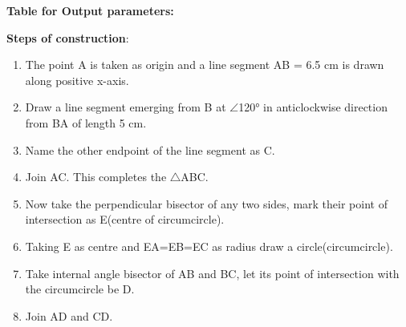 \documentclass[journal,12pt,twocolumn]{IEEEtran}
\renewcommand\thesection{\arabic{section}}
\begin{document}
\begin{enumerate}[label=\thesection.\arabic*.,ref=\thesection.\theenumi]
\textbf{Table for Output parameters:}
\begin{table}[h]
\centering
\caption{}
 	
\end{table}

\textbf{Steps of construction}:\\
\begin{enumerate}
\item
The point A is taken as origin and a line segment AB = 6.5 cm is drawn along positive x-axis.\\
\item
Draw a line segment emerging from B at $\angle$120° in anticlockwise direction from BA of length 5 cm.\\
\item
Name the other endpoint of the line segment as C.\\
\item
Join AC. This completes the $\bigtriangleup$ABC.\\
\item
Now take the perpendicular bisector of any two sides, mark their point of intersection as E(centre of circumcircle).\\
\item
Taking E as centre and EA=EB=EC as radius draw a circle(circumcircle).\\
\item
Take internal angle bisector of AB and BC, let its point of intersection with the circumcircle be D.\\
\item
Join AD and CD.\\
\end{enumerate}


\end{enumerate}
\end{document}
